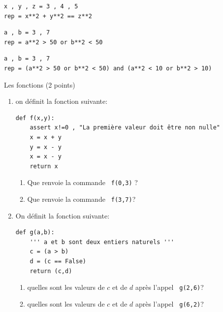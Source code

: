 \documentclass[a4paper,12pt,openany]{book}
\begin{document}
	\begin{lstlisting}
x , y , z = 3 , 4 , 5
rep = x**2 + y**2 == z**2
\end{lstlisting}

\bigskip

	\begin{lstlisting}
a , b = 3 , 7
rep = a**2 > 50 or b**2 < 50
\end{lstlisting}
\bigskip

	\begin{lstlisting}
a , b = 3 , 7
rep = (a**2 > 50 or b**2 < 50) and (a**2 < 10 or b**2 > 10)

\end{lstlisting}

\newpage

\exo \qquad Les fonctions \hfill
(2 points)

\begin{enumerate}
	\item on définit la fonction suivante:
	
\begin{lstlisting}
def f(x,y):
	assert x!=0 , "La première valeur doit être non nulle"
	x = x + y
	y = x - y
	x = x - y
	return x

\end{lstlisting}

	\begin{enumerate}
		\item Que renvoie la commande \verb+ f(0,3)+ ? \dotfill
		\item Que renvoie la commande \verb+ f(3,7)+? \dotfill
	\end{enumerate}

\medskip

\item On définit la fonction suivante:

\begin{lstlisting}
def g(a,b):
	''' a et b sont deux entiers naturels '''
	c = (a > b)
	d = (c == False)
	return (c,d)

\end{lstlisting}

\begin{enumerate}
	\item quelles sont les valeurs de $c$ et de $d$ après l'appel \verb+ g(2,6)+?\dotfill
	\item quelles sont les valeurs de $c$ et de $d$ après l'appel \verb+ g(6,2)+?\dotfill
\end{enumerate}
\end{enumerate}
\end{document}
